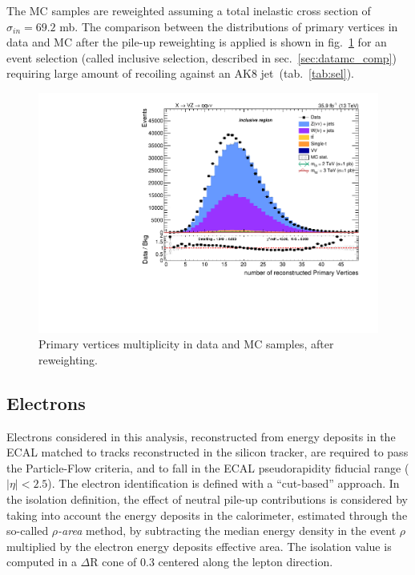 \noindent The MC samples are reweighted assuming a total inelastic cross section of $\sigma_{in} = 69.2$ mb. The comparison between the distributions of primary vertices in data and MC after the pile-up reweighting is applied is shown in fig.~\ref{fig:npv} for an event selection (called inclusive selection, described in sec.~\ref{sec:datamc_comp}) requiring large amount of \met recoiling against an AK8 jet~(tab.~\ref{tab:sel}).
 
 \begin{figure}[!htb]
  \centering
    \includegraphics[width=.495\textwidth]{plots/v9_thesis/XVZnnInc/nPV.pdf}
  \caption{Primary vertices multiplicity in data and MC samples, after reweighting.}
  \label{fig:npv}
 \end{figure}


\subsection{Electrons}\label{ssec:electrons}

Electrons considered in this analysis, reconstructed from energy deposits in the ECAL matched to tracks reconstructed in the silicon tracker, are required to pass the Particle-Flow criteria, and to fall in the ECAL pseudorapidity fiducial range ($|\eta|<2.5$). The electron identification is defined with a ``cut-based'' approach. In the isolation definition, the effect of neutral pile-up contributions is considered by taking into account the energy deposits in the calorimeter, estimated through the so-called \emph{$\rho$-area} method, by subtracting the median energy density in the event $\rho$ multiplied by the electron energy deposits effective area. The isolation value is computed in a $\Delta$R cone of 0.3 centered along the lepton direction.

